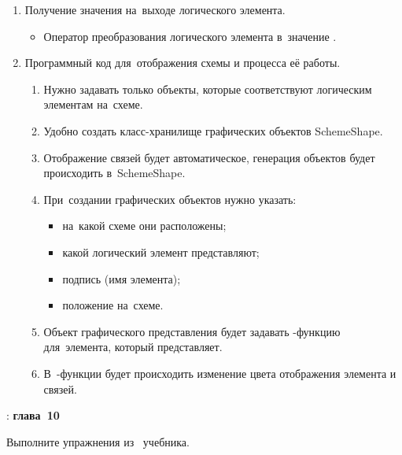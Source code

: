 \begin{enumerate}
    \item Получение значения на~выходе логического элемента.
    \begin{itemize}
        \item Оператор преобразования логического элемента в~значение .
    \end{itemize}

    \item Программный код для~отображения схемы и процесса её работы.
    \begin{enumerate}
        \item Нужно задавать только объекты, которые соответствуют логическим элементам на~схеме.
        \item Удобно создать класс-хранилище графических объектов SchemeShape.
        \item Отображение связей будет автоматическое, генерация объектов будет происходить в~SchemeShape.
        \item При~создании графических объектов нужно указать:
        \begin{itemize}
            \item на~какой схеме они расположены;
            \item какой логический элемент представляют;
            \item подпись (имя элемента);
            \item положение на~схеме.
        \end{itemize}
        \item Объект графического представления будет задавать -функцию для~элемента, который представляет.
        \item В~-функции будет происходить изменение цвета отображения элемента и связей.
    \end{enumerate}
\end{enumerate}



\WhatToReadSection
\textcite{Stroustrup:2016:ru}: \textbf{глава~10}



\ExercisesSection
\begin{exercise}
\item Выполните упражнения из~ учебника.

\end{exercise}
